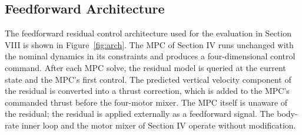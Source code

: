 \documentclass[conference]{IEEEtran}
\begin{document}
\subsection{Feedforward Architecture}
The feedforward residual control architecture used for the evaluation in Section VIII is shown in Figure~\ref{fig:arch}. The MPC of Section IV runs unchanged with the nominal dynamics in its constraints and produces a four-dimensional control command. After each MPC solve, the residual model is queried at the current state and the MPC's first control. The predicted vertical velocity component of the residual is converted into a thrust correction, which is added to the MPC's commanded thrust before the four-motor mixer. The MPC itself is unaware of the residual; the residual is applied externally as a feedforward signal. The body-rate inner loop and the motor mixer of Section IV operate without modification.
\end{document}
